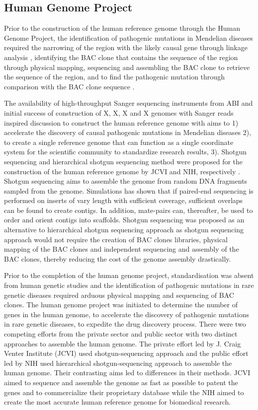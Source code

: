 \subsection{Human Genome Project}


Prior to the construction of the human reference genome through the Human Genome Project, the identification of pathogenic mutations in Mendelian diseases required the narrowing of the region with the likely causal gene through linkage analysis \cite{}, identifying the BAC clone that contains the sequence of the region through physical mapping, sequencing and assembling the BAC clone to retrieve the sequence of the region, and to find the pathogenic mutation through comparison with the BAC clone sequence \cite{}. 

The availability of high-throughput Sanger sequencing instruments from ABI and initial success of construction of X, X, X and X genomes with Sanger reads inspired discussion to construct the human reference genome with aims to 1) accelerate the discovery of causal pathogenic mutations in Mendelian diseases 2),  to create a single reference genome that can function as a single coordinate system for the scientific community to standardize research results, 3).  Shotgun sequencing and hierarchical shotgun sequencing method were proposed for the construction of the human reference genome by JCVI and NIH, respectively \cite{}.  Shotgun sequencing aims to assemble the genome from random DNA fragments sampled from the genome. Simulations has shown that if paired-end sequencing is performed on inserts of vary length with sufficient coverage, sufficient overlaps can be found to create contigs. In addition, mate-pairs can, thereafter, be used to order and orient contigs into scaffolds. Shotgun sequencing was proposed as an alternative to hierarchical shotgun sequencing approach as shotgun sequencing approach would not require the creation of BAC clones libraries, physical mapping of the BAC clones and independent sequencing and assembly of the BAC clones, thereby reducing the cost of the genome assembly drastically. 

Prior to the completion of the human genome project, standardisation was absent from human genetic studies and the identification of pathogenic mutations in rare genetic diseases required arduous physical mapping and sequencing of BAC clones. The human genome project was initiated to determine the number of genes in the human genome, to accelerate the discovery of pathogenic mutations in rare genetic diseases, to expedite the drug discovery process. There were two competing efforts from the private sector and public sector with two distinct approaches to assemble the human genome. The private effort led by J. Craig Venter Institute (JCVI) used shotgun-sequencing approach and the public effort led by NIH used hierarchical shotgun-sequencing approach to assemble the human genome. Their contrasting aims led to differences in their methods. JCVI aimed to sequence and assemble the genome as fast as possible to patent the genes and to commercialize their proprietary database while the NIH aimed to create the most accurate human reference genome for biomedical research. 

